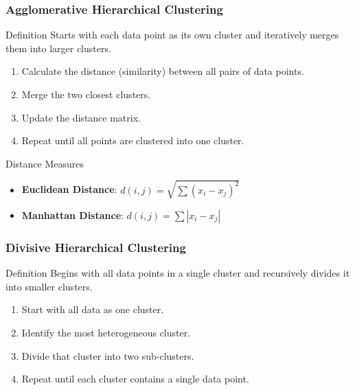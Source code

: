 \documentclass[aspectratio=169]{beamer}
\begin{document}
\begin{frame}[fragile]
    \frametitle{Agglomerative Hierarchical Clustering}
    \begin{block}{Definition}
        Starts with each data point as its own cluster and iteratively merges them into larger clusters.
    \end{block}
    \begin{enumerate}
        \item Calculate the distance (similarity) between all pairs of data points.
        \item Merge the two closest clusters.
        \item Update the distance matrix.
        \item Repeat until all points are clustered into one cluster.
    \end{enumerate}
    \begin{block}{Distance Measures}
        \begin{itemize}
            \item \textbf{Euclidean Distance}: $d(i, j) = \sqrt{\sum (x_i - x_j)^2}$
            \item \textbf{Manhattan Distance}: $d(i, j) = \sum |x_i - x_j|$
        \end{itemize}
    \end{block}
\end{frame}

\begin{frame}[fragile]
    \frametitle{Divisive Hierarchical Clustering}
    \begin{block}{Definition}
        Begins with all data points in a single cluster and recursively divides it into smaller clusters.
    \end{block}
    \begin{enumerate}
        \item Start with all data as one cluster.
        \item Identify the most heterogeneous cluster.
        \item Divide that cluster into two sub-clusters.
        \item Repeat until each cluster contains a single data point.
    \end{enumerate}
\end{frame}
\end{document}
